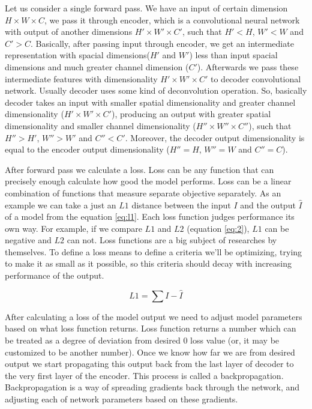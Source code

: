 Let us consider a single forward pass. We have an input of certain dimension $H \times W \times C$, we pass it through encoder, which is a convolutional neural network with output of another dimensions $H' \times W' \times C'$, such that $H' < H$, $W' < W$ and $C' > C$. Basically, after passing input through encoder, we get an intermediate representation with spacial dimensions($H'$ and $W'$) less than input spacial dimensions and much greater channel dimension ($C'$). Afterwards we pass these intermediate features with dimensionality $H' \times W' \times C'$ to decoder convolutional network. Usually decoder uses some kind of deconvolution operation. So, basically decoder takes an input with smaller spatial dimensionality and greater channel dimensionality ($H' \times W' \times C'$), producing an output with greater spatial dimensionality and smaller channel dimensionality ($H'' \times W'' \times C''$), such that $H'' > H'$, $W'' > W'$ and $C'' < C'$. Moreover, the decoder output dimensionality is equal to the encoder output dimensionality ($H'' = H$, $W'' = W$ and $C'' = C$).

After forward pass we calculate a loss. Loss can be any function that can precisely enough calculate how good the model performs. Loss can be a linear combination of functions that measure separate objective separately. As an example we can take a just an $L1$ distance between the input $I$ and the output $\hat{I}$ of a model from the equation \ref{eq:l1}. Each loss function judges performance its own way. For example, if we compare $L1$ and $L2$ (equation \ref{eq:2}), $L1$ can be negative and $L2$ can not. Loss functions are a big subject of researches by themselves. To define a loss means to define a criteria we'll be optimizing, trying to make it as small as it possible, so this criteria should decay with increasing performance of the output.

\begin{equation}
    \label{eq:l1}
    L1=\sum{I-\hat{I}}
\end{equation}

After calculating a loss of the model output we need to adjust model parameters based on what loss function returns. Loss function returns a number which can be treated as a degree of deviation from desired $0$ loss value (or, it may be customized to be another number). Once we know how far we are from desired output we start propagating this output back from the last layer of decoder to the very first layer of the encoder. This process is called a backpropagation. Backpropagation is a way of spreading gradients back through the network, and adjusting each of network parameters based on these gradients.

